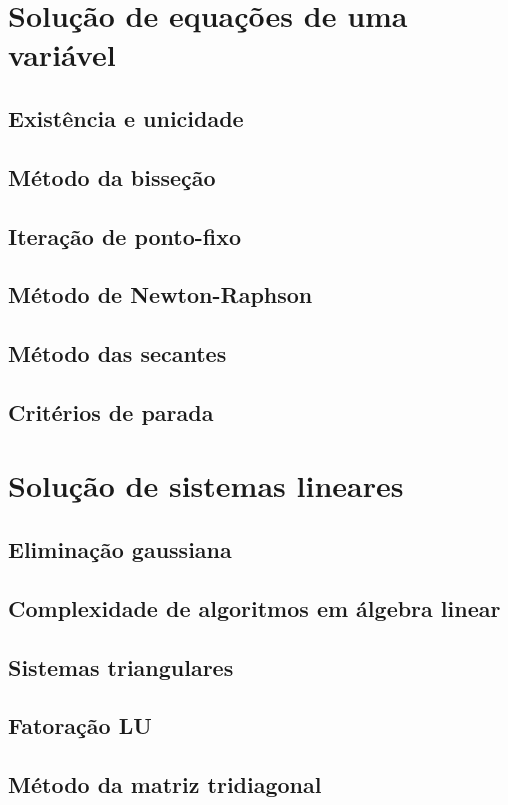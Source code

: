 \documentclass{article}
\theoremstyle{plain}
\theoremstyle{definition}
\theoremstyle{remark}
\begin{document}
\section{Solução de equações de uma variável}

\subsection{Existência e unicidade}
\subsection{Método da bisseção}
\subsection{Iteração de ponto-fixo}
\subsection{Método de Newton-Raphson}
\subsection{Método das secantes}
\subsection{Critérios de parada}

\section{Solução de sistemas lineares}

\subsection{Eliminação gaussiana}
\subsection{Complexidade de algoritmos em álgebra linear}
\subsection{Sistemas triangulares}
\subsection{Fatoração LU}
\subsection{Método da matriz tridiagonal}
\end{document}
